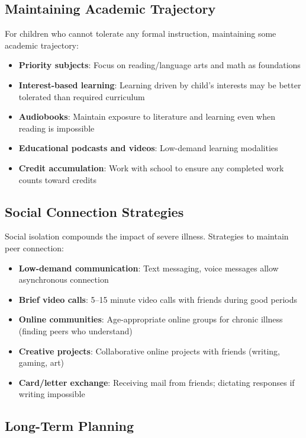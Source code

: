 \subsection{Maintaining Academic Trajectory}

For children who cannot tolerate any formal instruction, maintaining some academic trajectory:

\begin{itemize}
    \item \textbf{Priority subjects}: Focus on reading/language arts and math as foundations
    \item \textbf{Interest-based learning}: Learning driven by child's interests may be better tolerated than required curriculum
    \item \textbf{Audiobooks}: Maintain exposure to literature and learning even when reading is impossible
    \item \textbf{Educational podcasts and videos}: Low-demand learning modalities
    \item \textbf{Credit accumulation}: Work with school to ensure any completed work counts toward credits
\end{itemize}

\subsection{Social Connection Strategies}

Social isolation compounds the impact of severe illness. Strategies to maintain peer connection:

\begin{itemize}
    \item \textbf{Low-demand communication}: Text messaging, voice messages allow asynchronous connection
    \item \textbf{Brief video calls}: 5--15 minute video calls with friends during good periods
    \item \textbf{Online communities}: Age-appropriate online groups for chronic illness (finding peers who understand)
    \item \textbf{Creative projects}: Collaborative online projects with friends (writing, gaming, art)
    \item \textbf{Card/letter exchange}: Receiving mail from friends; dictating responses if writing impossible
\end{itemize}

\subsection{Long-Term Planning}


